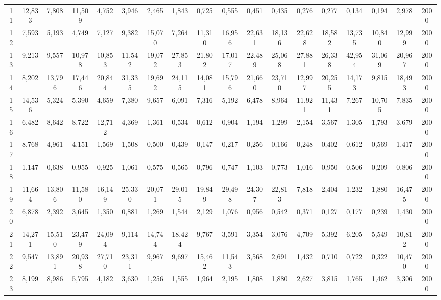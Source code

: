 {\begin{longtable}{ >{\tiny}cccccccccccccccccc}
11  & 12,833 & 7,808  & 11,509 & 4,752  & 3,946  & 2,465  & 1,843  & 0,725  & 0,555  & 0,451  & 0,435  & 0,276   & 0,277   & 0,134   & 0,194   & 2,978   & 2000 \\
12  & 7,593  & 5,193  & 4,749  & 7,127  & 9,382  & 15,070 & 7,264  & 11,310 & 16,956 & 22,631 & 18,136 & 22,628  & 18,582  & 13,735  & 10,840  & 12,999  & 2000 \\
13  & 9,213  & 9,557  & 10,978 & 10,853 & 11,542 & 19,072 & 27,853 & 21,802 & 17,017 & 22,489 & 25,068 & 27,881  & 26,338  & 42,954  & 31,069  & 20,967  & 2000 \\
14  & 8,202  & 13,796 & 17,446 & 20,844 & 31,335 & 19,692 & 24,115 & 14,081 & 15,796 & 21,660 & 23,710 & 12,997  & 20,255  & 14,173  & 9,815   & 18,493  & 2000 \\
15  & 14,536 & 5,324  & 5,390  & 4,659  & 7,380  & 9,657  & 6,091  & 7,316  & 5,192  & 6,478  & 8,964  & 11,921  & 11,431  & 7,267   & 10,705  & 7,835   & 2000 \\
16  & 6,482  & 8,642  & 8,722  & 12,712 & 4,369  & 1,361  & 0,534  & 0,612  & 0,904  & 1,194  & 1,299  & 2,154   & 3,567   & 1,305   & 1,793   & 3,679   & 2000 \\
17  & 8,768  & 4,961  & 4,151  & 1,569  & 1,508  & 0,500  & 0,439  & 0,147  & 0,217  & 0,256  & 0,166  & 0,248   & 0,402   & 0,612   & 0,569   & 1,417   & 2000 \\
18  & 1,147  & 0,638  & 0,955  & 0,925  & 1,061  & 0,575  & 0,565  & 0,796  & 0,747  & 1,103  & 0,773  & 1,016   & 0,950   & 0,506   & 0,209   & 0,806   & 2000 \\
19  & 11,664 & 13,806 & 11,580 & 16,149 & 25,330 & 20,071 & 29,015 & 19,849 & 29,498 & 24,307 & 22,813 & 7,818   & 2,404   & 1,232   & 1,880   & 16,475  & 2000 \\
20  & 6,878  & 2,392  & 3,645  & 1,350  & 0,881  & 1,269  & 1,544  & 2,129  & 1,076  & 0,956  & 0,542  & 0,371   & 0,127   & 0,177   & 0,239   & 1,430   & 2000 \\
21  & 14,271 & 15,510 & 23,479 & 24,094 & 9,114  & 14,744 & 18,424 & 9,767  & 3,591  & 3,354  & 3,076  & 4,709   & 5,392   & 6,205   & 5,549   & 10,812  & 2000 \\
22  & 9,547  & 13,891 & 20,938 & 27,710 & 23,311 & 9,967  & 9,697  & 15,462 & 11,543 & 3,568  & 2,691  & 1,432   & 0,710   & 0,722   & 0,322   & 10,470  & 2000 \\
23  & 8,199  & 8,986  & 5,795  & 4,182  & 3,630  & 1,256  & 1,555  & 1,964  & 2,195  & 1,808  & 1,880  & 2,627   & 3,815   & 1,765   & 1,462   & 3,306   & 2000 \\

\end{longtable}}
